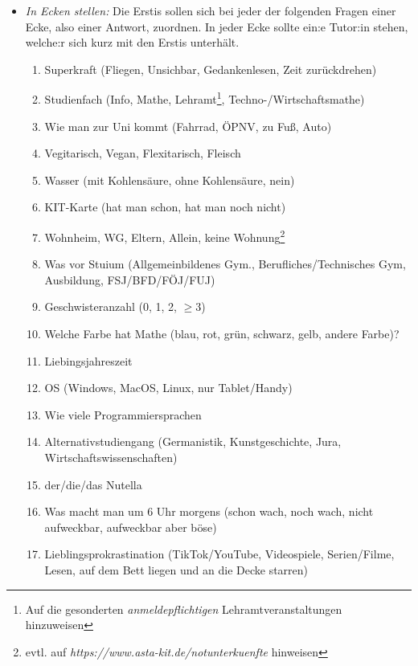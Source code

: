 \documentclass[10pt,twocolumn,ngerman]{scrartcl}
\begin{document}
\begin{itemize}
    \item \emph{In Ecken stellen:} Die Erstis sollen sich bei jeder der
        folgenden Fragen einer Ecke, also einer Antwort, zuordnen. In jeder Ecke
        sollte ein:e Tutor:in stehen, welche:r sich kurz mit den Erstis
        unterhält.
        \begin{enumerate}
            \item Superkraft (Fliegen, Unsichbar, Gedankenlesen, Zeit zurückdrehen)
            \item Studienfach (Info, Mathe, Lehramt\footnote{Auf die gesonderten \emph{anmeldepflichtigen} Lehramtveranstaltungen hinzuweisen}, Techno-/Wirtschaftsmathe)
            \item Wie man zur Uni kommt (Fahrrad, ÖPNV, zu Fuß, Auto)
            \item Vegitarisch, Vegan, Flexitarisch, Fleisch
            \item Wasser (mit Kohlensäure, ohne Kohlensäure, nein)
            \item KIT-Karte (hat man schon, hat man noch nicht)
            \item Wohnheim, WG, Eltern, Allein, keine Wohnung\footnote{evtl. auf \emph{https://www.asta-kit.de/notunterkuenfte} hinweisen}
            \item Was vor Stuium (Allgemeinbildenes Gym., Berufliches/Technisches Gym, Ausbildung, FSJ/BFD/FÖJ/FUJ)
            \item Geschwisteranzahl (0, 1, 2, $\geq 3$)
            \item Welche Farbe hat Mathe (blau, rot, grün, schwarz, gelb, andere Farbe)?
            \item Liebingsjahreszeit 
            \item OS (Windows, MacOS, Linux, nur Tablet/Handy)
            \item Wie viele Programmiersprachen
            \item Alternativstudiengang (Germanistik, Kunstgeschichte, Jura, Wirtschaftswissenschaften)
            \item der/die/das Nutella
            \item Was macht man um 6 Uhr morgens (schon wach, noch wach, nicht aufweckbar, aufweckbar aber böse)
            \item Lieblingsprokrastination (TikTok/YouTube, Videospiele, Serien/Filme, Lesen, auf dem Bett liegen und an die Decke starren)
        \end{enumerate}


\end{itemize}
\end{document}
